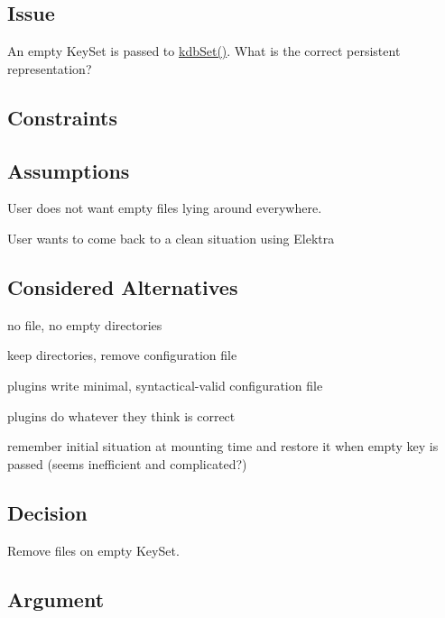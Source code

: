 \subsection*{Issue}

An empty Key\+Set is passed to \hyperlink{group__kdb_ga11436b058408f83d303ca5e996832bcf}{kdb\+Set()}. What is the correct persistent representation?

\subsection*{Constraints}

\subsection*{Assumptions}


\begin{DoxyItemize}
\item User does not want empty files lying around everywhere.
\item User wants to come back to a clean situation using Elektra
\end{DoxyItemize}

\subsection*{Considered Alternatives}


\begin{DoxyItemize}
\item no file, no empty directories
\item keep directories, remove configuration file
\item plugins write minimal, syntactical-\/valid configuration file
\item plugins do whatever they think is correct
\item remember initial situation at mounting time and restore it when empty key is passed (seems inefficient and complicated?)
\end{DoxyItemize}

\subsection*{Decision}

Remove files on empty Key\+Set.

\subsection*{Argument}



